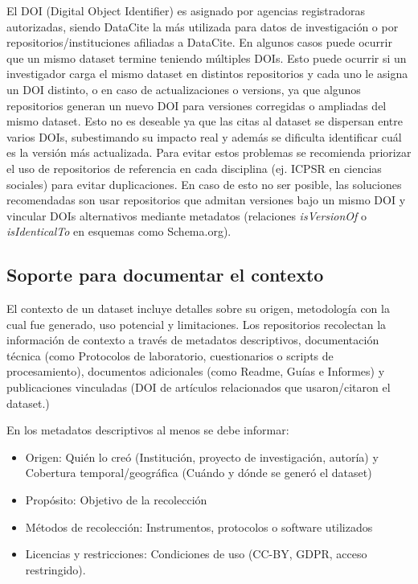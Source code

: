 \documentclass[runningheads]{llncs}
\begin{document}
El DOI (Digital Object Identifier) es asignado por agencias registradoras autorizadas, siendo DataCite la más utilizada para datos de investigación o por repositorios/instituciones afiliadas a DataCite. En algunos casos puede ocurrir que un mismo dataset termine teniendo múltiples DOIs. Esto puede ocurrir si un investigador carga el mismo dataset en distintos repositorios y cada uno le asigna un DOI distinto, o en caso de actualizaciones o versions, ya que algunos repositorios generan un nuevo DOI para versiones corregidas o ampliadas del mismo dataset. Esto no es deseable ya que las citas al dataset se dispersan entre varios DOIs, subestimando su impacto real y además se dificulta identificar cuál es la versión más actualizada. Para evitar estos problemas se recomienda priorizar el uso de repositorios de referencia en cada disciplina (ej. ICPSR en ciencias sociales) para evitar duplicaciones. En caso de esto no ser posible, las soluciones recomendadas son usar repositorios que admitan versiones bajo un mismo DOI y vincular DOIs alternativos mediante metadatos (relaciones \emph{isVersionOf} o \emph{isIdenticalTo} en esquemas como Schema.org). 

\subsection*{Soporte para documentar el contexto}

El contexto de un dataset incluye detalles sobre su origen, metodología con la cual fue generado, uso potencial y limitaciones. Los repositorios recolectan la información de contexto a través de metadatos descriptivos, documentación técnica (como Protocolos de laboratorio, cuestionarios o scripts de procesamiento), documentos adicionales (como Readme, Guías e Informes) y publicaciones vinculadas (DOI de artículos relacionados que usaron/citaron el dataset.)

En los metadatos descriptivos al menos se debe informar:  
\begin{itemize}
\item Origen: Quién lo creó (Institución, proyecto de investigación, autoría) y Cobertura temporal/geográfica (Cuándo y dónde se generó el dataset) 
\item Propósito: Objetivo de la recolección 
\item Métodos de recolección: Instrumentos, protocolos o software utilizados 
\item Licencias y restricciones: Condiciones de uso (CC-BY, GDPR, acceso restringido).
\end{itemize}
\end{document}
